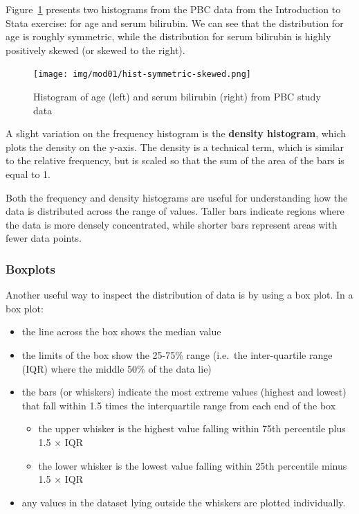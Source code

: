 \documentclass[
  a4paper,
]{memoir}
\providecommand{\tightlist}{%
  \setlength{\itemsep}{0pt}\setlength{\parskip}{0pt}}\usepackage{longtable,booktabs,array}
\begin{document}
Figure~\ref{fig-hist-1} presents two histograms from the PBC data from
the Introduction to Stata exercise: for age and serum bilirubin. We can
see that the distribution for age is roughly symmetric, while the
distribution for serum bilirubin is highly positively skewed (or skewed
to the right).

\begin{figure}

{\centering \texttt{[image: img/mod01/hist-symmetric-skewed.png]}

}

\caption{\label{fig-hist-1}Histogram of age (left) and serum bilirubin
(right) from PBC study data}

\end{figure}

A slight variation on the frequency histogram is the \textbf{density
histogram}, which plots the density on the y-axis. The density is a
technical term, which is similar to the relative frequency, but is
scaled so that the sum of the area of the bars is equal to 1.

Both the frequency and density histograms are useful for understanding
how the data is distributed across the range of values. Taller bars
indicate regions where the data is more densely concentrated, while
shorter bars represent areas with fewer data points.

\hypertarget{boxplots}{%
\subsubsection{Boxplots}\label{boxplots}}

Another useful way to inspect the distribution of data is by using a box
plot. In a box plot:

\begin{itemize}
\tightlist
\item
  the line across the box shows the median value
\item
  the limits of the box show the 25-75\% range (i.e.~the inter-quartile
  range (IQR) where the middle 50\% of the data lie)
\item
  the bars (or whiskers) indicate the most extreme values (highest and
  lowest) that fall within 1.5 times the interquartile range from each
  end of the box

  \begin{itemize}
  \tightlist
  \item
    the upper whisker is the highest value falling within 75th
    percentile plus 1.5 × IQR
  \item
    the lower whisker is the lowest value falling within 25th percentile
    minus 1.5 × IQR
  \end{itemize}
\item
  any values in the dataset lying outside the whiskers are plotted
  individually.
\end{itemize}
\end{document}
